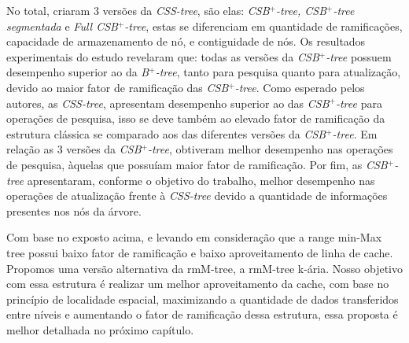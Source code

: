  No total, \citet{paper-making-btree-cache} criaram $3$ versões da \textit{CSS-tree}, são elas: \textit{CSB$^+$-tree, CSB$^+$-tree segmentada} e  \textit{Full CSB$^+$-tree}, estas se diferenciam em quantidade de ramificações, capacidade de armazenamento de nó, e contiguidade de nós. Os resultados experimentais do estudo revelaram que: todas as versões da \textit{CSB$^+$-tree} possuem desempenho superior ao da \textit{B$^+$-tree}, tanto para pesquisa quanto para atualização, devido ao maior fator de ramificação das \textit{CSB$^+$-tree}. Como esperado pelos autores, as \textit{CSS-tree}, apresentam desempenho superior ao das \textit{CSB$^+$-tree} para operações de pesquisa, isso se deve também ao elevado fator de ramificação da estrutura clássica se comparado aos das diferentes versões da \textit{CSB$^+$-tree}. Em relação as $3$ versões da \textit{CSB$^+$-tree}, obtiveram melhor desempenho nas operações de pesquisa, àquelas que possuíam maior fator de ramificação. Por fim, as \textit{CSB$^+$-tree} apresentaram, conforme o objetivo do trabalho, melhor desempenho nas operações de atualização frente à \textit{CSS-tree} devido a quantidade de informações presentes nos nós da árvore\citep{paper-making-btree-cache}.

Com base no exposto acima, e levando em consideração que a range min-Max tree possui baixo fator de ramificação e baixo aproveitamento de linha de cache. Propomos uma versão alternativa da rmM-tree, a rmM-tree k-ária. Nosso objetivo com essa estrutura é  realizar um melhor aproveitamento da cache, com base no princípio de localidade espacial, maximizando a quantidade de dados transferidos entre níveis e aumentando o fator de ramificação dessa estrutura, essa proposta é melhor detalhada no próximo capítulo.

